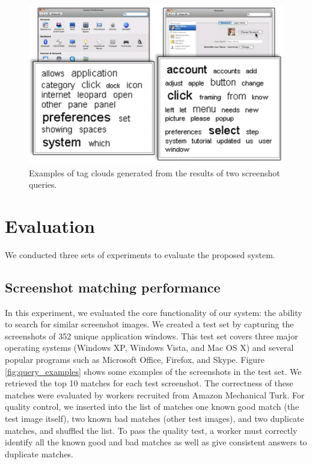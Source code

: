 \documentclass{www2010-submission}
\begin{document}
\begin{figure}
\includegraphics[width=1\columnwidth]{figure/tag_clouds.png}
\caption{Examples of tag clouds generated from the 
results of two screenshot queries.}
\label{fig:tag_clouds}
\end{figure}


\section{Evaluation}
\label{sec:evaluation}

We conducted three sets of experiments to evaluate the proposed system.

\subsection{Screenshot matching performance}

In this experiment, we evaluated the core functionality of our system:
the ability to search for similar screenshot images.  We created a
test set by capturing the screenshots of 352 unique application
windows. This test set covers three major operating systems (Windows
XP, Windows Vista, and Mac OS X) and several popular programs such as
Microsoft Office, Firefox, and Skype. Figure \ref{fig:query_examples}
shows some examples of the screenshots in the test set. We retrieved
the top 10 matches for each test screenshot. The correctness of these
matches were evaluated by workers recruited from Amazon Mechanical
Turk. For quality control, we inserted into the list of matches one
known good match (the test image itself), two known bad matches (other
test images), and two duplicate matches, and shuffled the list. To
pass the quality test, a worker must correctly identify all the known
good and bad matches as well as give consistent answers to duplicate
matches. 
\end{document}
